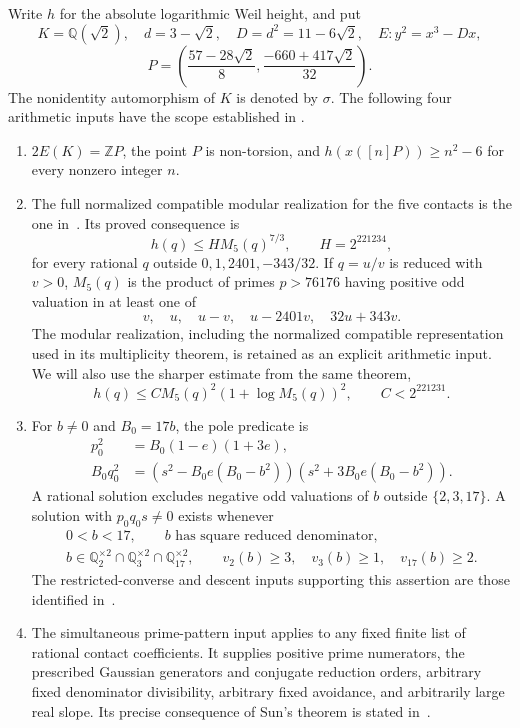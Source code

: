 \documentclass[11pt,a4paper]{article}
\newcommand{\Q}{\mathbb Q}\newcommand{\Z}{\mathbb Z}
\begin{document}
Write $h$ for the absolute logarithmic Weil height, and put
\[
 K=\Q(\sqrt2),\quad d=3-\sqrt2,\quad D=d^2=11-6\sqrt2,
 \quad E:y^2=x^3-Dx,
\]
\[
 P=\left(\frac{57-28\sqrt2}{8},
          \frac{-660+417\sqrt2}{32}\right).
\]
The nonidentity automorphism of $K$ is denoted by $\sigma$.
The following four arithmetic inputs have the scope established in
\cite{Dependencies,Source}.
\begin{enumerate}
\item $2E(K)=\Z P$, the point $P$ is non-torsion, and
$h(x([n]P))\ge n^2-6$ for every nonzero integer $n$.
\item The full normalized compatible modular realization for the
five contacts is the one in~\cite{Multiplicity}. Its proved consequence is
\begin{equation}\label{eq:baseheight}
 h(q)\le H M_5(q)^{7/3},\qquad H=2^{221234},
\end{equation}
for every rational $q$ outside $0,1,2401,-343/32$. If $q=u/v$
is reduced with $v>0$, $M_5(q)$ is the product of primes
$p>76176$ having positive odd valuation in at least one of
\[
                 v,\quad u,\quad u-v,\quad u-2401v,
                         \quad32u+343v.
\]
The modular realization, including the normalized compatible
representation used in its multiplicity theorem, is retained as
an explicit arithmetic input.
We will also use the sharper estimate from the same theorem,
\begin{equation}\label{eq:logbase}
 h(q)\le C M_5(q)^2(1+\log M_5(q))^2,\qquad C<2^{221231}.
\end{equation}
\item For $b\ne0$ and $B_0=17b$, the pole predicate is
\begin{equation}\label{eq:pole}
 \begin{split}
 p_0^2&=B_0(1-e)(1+3e),\\
 B_0q_0^2&=(s^2-B_0e(B_0-b^2))(s^2+3B_0e(B_0-b^2)).
 \end{split}
\end{equation}
A rational solution excludes negative odd valuations of $b$ outside
$\{2,3,17\}$. A solution with $p_0q_0s\ne0$ exists whenever
\begin{equation}\label{eq:prepared}
 \begin{gathered}
 0<b<17,\qquad b\text{ has square reduced denominator},\\
 b\in\Q_2^{\times2}\cap\Q_3^{\times2}\cap\Q_{17}^{\times2},
 \qquad v_2(b)\ge3,\quad v_3(b)\ge1,\quad v_{17}(b)\ge2.
 \end{gathered}
\end{equation}
The restricted-converse and descent inputs supporting this assertion
are those identified in~\cite{Dependencies,PointSource}.
\item The simultaneous prime-pattern input applies to any fixed
finite list of rational contact coefficients. It supplies positive
prime numerators, the prescribed Gaussian generators and conjugate
reduction orders, arbitrary fixed denominator divisibility, arbitrary
fixed avoidance, and arbitrarily large real slope. Its precise
consequence of Sun's theorem is stated in~\cite{Dependencies}.
\end{enumerate}
\end{document}
